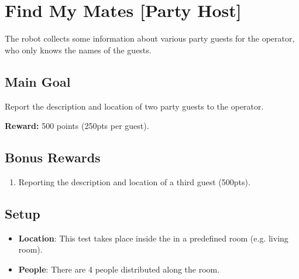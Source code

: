 \section{Find My Mates [Party Host]}
\label{test:find-my-mates}

The robot collects some information about various party guests for the operator, who only knows the names of the guests.

\subsection*{Main Goal}

Report the description and location of two party guests to the operator.

\noindent\textbf{Reward:} 500 points (250pts per guest).

\subsection*{Bonus Rewards}
\begin{enumerate}[nosep]
	\item Reporting the description and location of a third guest (500pts).
\end{enumerate}

\subsection*{Setup}
\begin{itemize}
	\item \textbf{Location}: This test takes place inside the \Arena{} in a predefined room (e.g. living room).
	\item \textbf{People}: There are 4 people distributed along the room.
\end{itemize}

